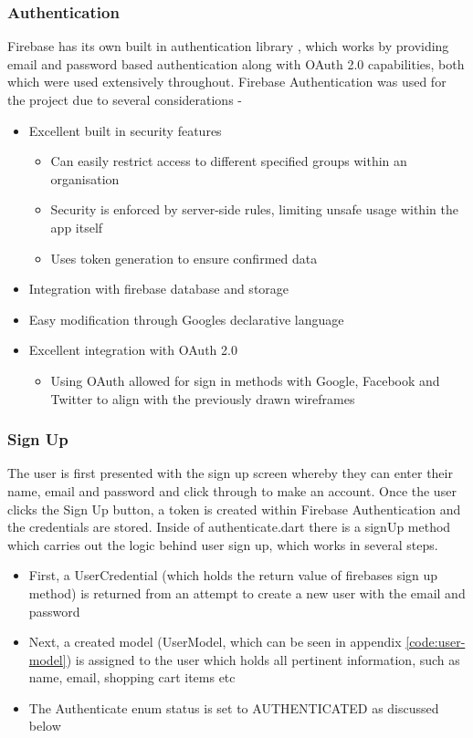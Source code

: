 \documentclass[12pt]{article}
\begin{document}
	\subsubsection{Authentication}
	\label{authentication}
	Firebase has its own built in authentication library \cite{FirebaseAuthentication2021}, which works by providing email and password based authentication along with OAuth 2.0 capabilities, both which were used extensively throughout. Firebase Authentication was used for the project due to several considerations -
	\begin{itemize}
		\item Excellent built in security features
		\begin{itemize}
			\item Can easily restrict access to different specified groups within an organisation
			\item Security is enforced by server-side rules, limiting unsafe usage within the app itself
			\item Uses token generation to ensure confirmed data
		\end{itemize}
		\item Integration with firebase database and storage
		\item Easy modification through Googles declarative language
		\item Excellent integration with OAuth 2.0
		\begin{itemize}
			\item Using OAuth allowed for sign in methods with Google, Facebook and Twitter to align with the previously drawn wireframes
		\end{itemize}
	\end{itemize}
	
	
	\subsubsection{Sign Up}
	The user is first presented with the sign up screen whereby they can enter their name, email and password and click through to make an account. Once the user clicks the Sign Up button, a token is created within Firebase Authentication and the credentials are stored. Inside of authenticate.dart there is a signUp method which carries out the logic behind user sign up, which works in several steps.
	\begin{itemize}
		\item First, a UserCredential (which holds the return value of firebases sign up method) is returned from an attempt to create a new user with the email and password
		\item Next, a created model (UserModel, which can be seen in appendix \ref{code:user-model}) is assigned to the user which holds all pertinent information, such as name, email, shopping cart items etc
		\item The Authenticate enum status is set to AUTHENTICATED as discussed below
	\end{itemize}
	
\end{document}

